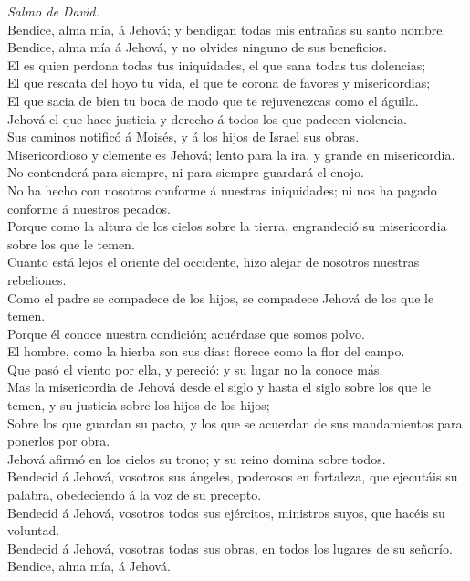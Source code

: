  \emph{Salmo de David.}\\
Bendice, alma mía, á Jehová; y bendigan todas mis entrañas su santo
nombre.\\
 Bendice, alma mía á Jehová, y no olvides ninguno de sus
beneficios.\\
 El es quien perdona todas tus iniquidades, el que sana
todas tus dolencias;\\
 El que rescata del hoyo tu vida, el que te corona de
favores y misericordias;\\
 El que sacia de bien tu boca de modo que te rejuvenezcas
como el águila.\\
 Jehová el que hace justicia y derecho á todos los que
padecen violencia.\\
 Sus caminos notificó á Moisés, y á los hijos de Israel sus
obras.\\
 Misericordioso y clemente es Jehová; lento para la ira, y
grande en misericordia.\\
 No contenderá para siempre, ni para siempre guardará el
enojo.\\
 No ha hecho con nosotros conforme á nuestras iniquidades;
ni nos ha pagado conforme á nuestros pecados.\\
 Porque como la altura de los cielos sobre la tierra,
engrandeció su misericordia sobre los que le temen.\\
 Cuanto está lejos el oriente del occidente, hizo alejar de
nosotros nuestras rebeliones.\\
 Como el padre se compadece de los hijos, se compadece
Jehová de los que le temen.\\
 Porque él conoce nuestra condición; acuérdase que somos
polvo.\\
 El hombre, como la hierba son sus días: florece como la
flor del campo.\\
 Que pasó el viento por ella, y pereció: y su lugar no la
conoce más.\\
 Mas la misericordia de Jehová desde el siglo y hasta el
siglo sobre los que le temen, y su justicia sobre los hijos de los
hijos;\\
 Sobre los que guardan su pacto, y los que se acuerdan de
sus mandamientos para ponerlos por obra.\\
 Jehová afirmó en los cielos su trono; y su reino domina
sobre todos.\\
 Bendecid á Jehová, vosotros sus ángeles, poderosos en
fortaleza, que ejecutáis su palabra, obedeciendo á la voz de su
precepto.\\
 Bendecid á Jehová, vosotros todos sus ejércitos, ministros
suyos, que hacéis su voluntad.\\
 Bendecid á Jehová, vosotras todas sus obras, en todos los
lugares de su señorío. Bendice, alma mía, á Jehová.

